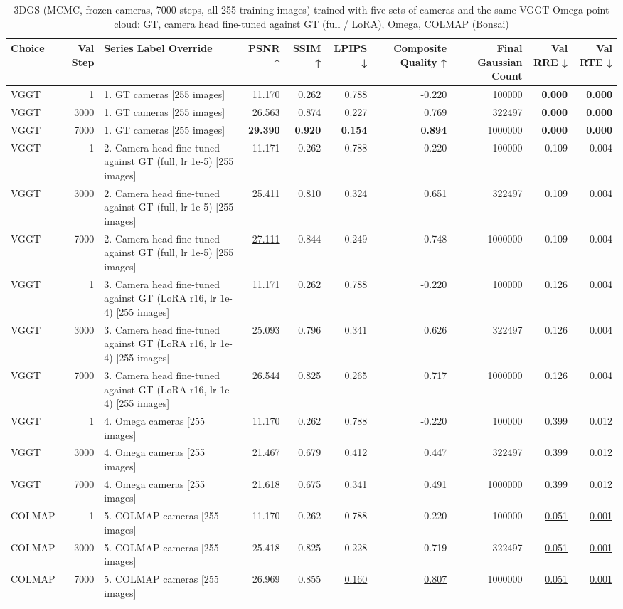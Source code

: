 \begin{table}[H]
\caption{\ifdefined\customcaption \customcaption \else 3DGS (MCMC, frozen cameras, 7000 steps, all 255 training images) trained with five sets of cameras and the same VGGT-Omega point cloud: GT, camera head fine-tuned against GT (full / LoRA), Omega, COLMAP (Bonsai) \fi}
\label{tab:103_omega_cameras_7k_full_bonsai}
\centering
\tiny
\begin{tabular}{lrlrrrrrrr}
\toprule
Choice & Val Step & Series Label Override & PSNR ↑ & SSIM ↑ & LPIPS ↓ & Composite Quality ↑ & Final Gaussian Count & Val RRE ↓ & Val RTE ↓ \\
\midrule
VGGT & 1 & 1. GT cameras [255 images] & 11.170 & 0.262 & 0.788 & -0.220 & 100000 & \textbf{0.000} & \textbf{0.000} \\
VGGT & 3000 & 1. GT cameras [255 images] & 26.563 & \underline{0.874} & 0.227 & 0.769 & 322497 & \textbf{0.000} & \textbf{0.000} \\
VGGT & 7000 & 1. GT cameras [255 images] & \textbf{29.390} & \textbf{0.920} & \textbf{0.154} & \textbf{0.894} & 1000000 & \textbf{0.000} & \textbf{0.000} \\
VGGT & 1 & 2. Camera head fine-tuned against GT (full, lr 1e-5) [255 images] & 11.171 & 0.262 & 0.788 & -0.220 & 100000 & 0.109 & 0.004 \\
VGGT & 3000 & 2. Camera head fine-tuned against GT (full, lr 1e-5) [255 images] & 25.411 & 0.810 & 0.324 & 0.651 & 322497 & 0.109 & 0.004 \\
VGGT & 7000 & 2. Camera head fine-tuned against GT (full, lr 1e-5) [255 images] & \underline{27.111} & 0.844 & 0.249 & 0.748 & 1000000 & 0.109 & 0.004 \\
VGGT & 1 & 3. Camera head fine-tuned against GT (LoRA r16, lr 1e-4) [255 images] & 11.171 & 0.262 & 0.788 & -0.220 & 100000 & 0.126 & 0.004 \\
VGGT & 3000 & 3. Camera head fine-tuned against GT (LoRA r16, lr 1e-4) [255 images] & 25.093 & 0.796 & 0.341 & 0.626 & 322497 & 0.126 & 0.004 \\
VGGT & 7000 & 3. Camera head fine-tuned against GT (LoRA r16, lr 1e-4) [255 images] & 26.544 & 0.825 & 0.265 & 0.717 & 1000000 & 0.126 & 0.004 \\
VGGT & 1 & 4. Omega cameras [255 images] & 11.170 & 0.262 & 0.788 & -0.220 & 100000 & 0.399 & 0.012 \\
VGGT & 3000 & 4. Omega cameras [255 images] & 21.467 & 0.679 & 0.412 & 0.447 & 322497 & 0.399 & 0.012 \\
VGGT & 7000 & 4. Omega cameras [255 images] & 21.618 & 0.675 & 0.341 & 0.491 & 1000000 & 0.399 & 0.012 \\
COLMAP & 1 & 5. COLMAP cameras [255 images] & 11.170 & 0.262 & 0.788 & -0.220 & 100000 & \underline{0.051} & \underline{0.001} \\
COLMAP & 3000 & 5. COLMAP cameras [255 images] & 25.418 & 0.825 & 0.228 & 0.719 & 322497 & \underline{0.051} & \underline{0.001} \\
COLMAP & 7000 & 5. COLMAP cameras [255 images] & 26.969 & 0.855 & \underline{0.160} & \underline{0.807} & 1000000 & \underline{0.051} & \underline{0.001} \\
\bottomrule
\end{tabular}
\end{table}